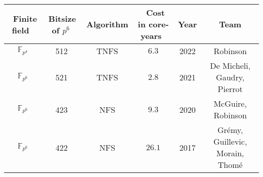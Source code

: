 \documentclass[preview]{standalone}
\begin{document}
\begin{center}
\begin{tabular}{|c|c|c|c|c|c|}
        \hline
        $ \,$ Finite field $ \,$ & $ \,$Bitsize of $p^6 \,$ & $ \,$ Algorithm $ \,$ & $ \,$ Cost in core-years $ \,$ & $ \,$ Year$ \,$ & $ \,$ Team $ \,$ \\
        \hline
        $\mathbb{F}_{p^4}$ & 512 & TNFS & $6.3$ & 2022 & Robinson \\
        $\mathbb{F}_{p^6}$ & 521 & TNFS & $2.8$ & 2021 & De Micheli, Gaudry, Pierrot \\
        $\mathbb{F}_{p^6}$ & 423 & NFS & $9.3$ & 2020 & McGuire, Robinson\\
        $\mathbb{F}_{p^6}$ & 422 & NFS & $26.1$ & 2017 & Grémy, Guillevic, Morain, Thomé \\
        \hline
    \end{tabular}
\end{center}
\end{document}
